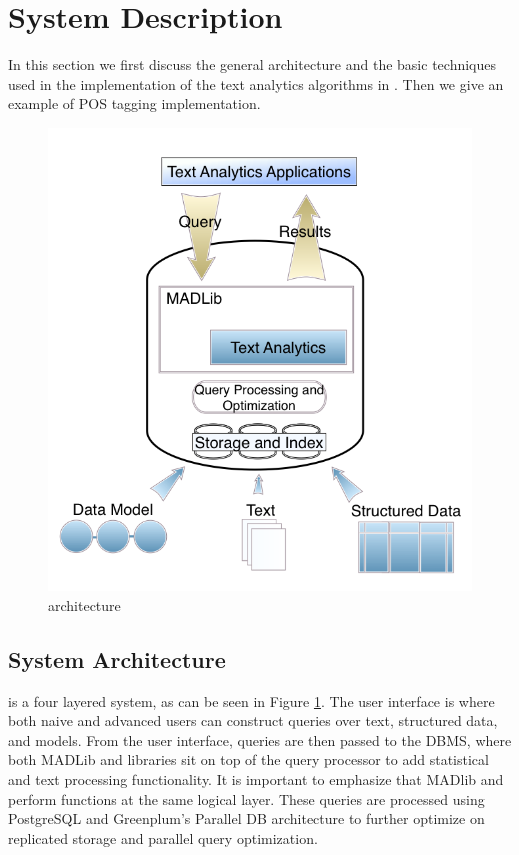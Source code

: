
\section{System Description}

In this section we first discuss the general architecture and the
basic techniques used in the implementation of the text analytics algorithms in {\system}.
Then we give an example of POS tagging implementation.

\begin{figure}
   \begin{center}
        \includegraphics[scale=0.2]{content/graphics/arch.png}
        \caption{{\system} architecture}
        \label{fig:arch}
   \end{center}
\end{figure}
    
\subsection{System Architecture}

{\system} is a four layered system, as can be seen in Figure \ref{fig:arch}.
The user interface is where both naive and advanced users can construct queries over
text, structured data, and models. From the user interface, queries are then passed to the
DBMS, where both MADLib and {\system} libraries sit on top of the query processor to
add statistical and text processing functionality. 
It is important to emphasize that MADlib and {\system} perform functions
at the same logical layer.  These queries are processed using 
PostgreSQL and Greenplum's Parallel DB architecture to further optimize on 
replicated storage and parallel query optimization. 



